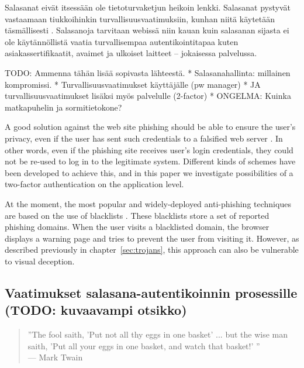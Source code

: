 \documentclass[english,gradu]{tktltiki}
\begin{document}
Salasanat eivät itsessään ole tietoturvaketjun heikoin lenkki. Salasanat pystyvät vastaamaan tiukkoihinkin turvallisuusvaatimuksiin, kunhan niitä käytetään täsmällisesti \cite{will_we_ever_escape_passwords_05}. Salasanoja tarvitaan webissä niin kauan kuin salasanan sijasta ei ole käytännöllistä vaatia turvallisempaa autentikointitapaa kuten asiakassertifikaatit, avaimet ja ulkoiset laitteet -- jokaisessa palvelussa.


TODO: Ammenna tähän lisää sopivasta lähteestä.
* Salasanahallinta: millainen kompromissi.
* Turvallisuusvaatimukset käyttäjälle (pw manager)
* JA turvallisuusvaatimukset lisäksi myös palvelulle (2-factor)
* ONGELMA: Kuinka matkapuhelin ja sormitietokone?

A good solution against the web site phishing should be able to ensure the user's privacy, even if the user has sent such credentials to a falsified web server \cite{phishing_attacks_and_solutions_2007}. In other words, even if the phishing site receives user's login credentials, they could not be re-used to log in to the legitimate system. Different kinds of schemes have been developed to achieve this, and in this paper we investigate possibilities of a two-factor authentication \cite{NIST_SP800-63, schneier_2factor_2005, google_2step_2010} on the application level.

At the moment, the most popular and widely-deployed anti-phishing techniques are based on the use of blacklists \cite{visual_similarity_phishing_2008}. These blacklists store a set of reported phishing domains. When the user visits a blacklisted domain, the browser displays a warning page and tries to prevent the user from visiting it. However, as described previously in chapter~\ref{sec:trojans}, this approach can also be vulnerable to visual deception.



\subsection{Vaatimukset salasana-autentikoinnin prosessille (TODO: kuvaavampi otsikko)}

           \begin{quote}
               ''The fool saith, 'Put not all thy eggs in one basket' ...
               but the wise man saith, 'Put all your eggs in one basket, and watch that basket!' ''
               \\--- Mark Twain \cite{twain_eggs_1894}
           \end {quote}
\end{document}
